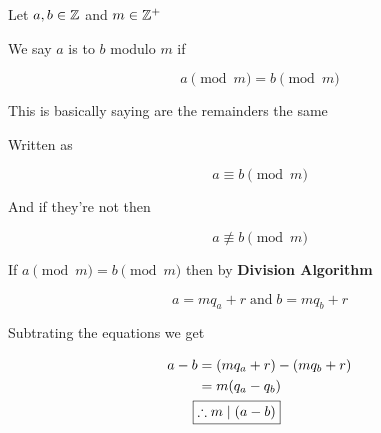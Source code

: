 \documentclass[../../Main.tex]{subfiles}
\begin{document}
\begin{definition}[Congruence]
    Let $a, b \in \mathbb{Z}$ and $m \in \mathbb{Z}^+$

    We say $a$ is  to $b$ modulo $m$ if

    $$a \pmod{m} = b \pmod{m}$$

    This is basically saying are the remainders the same

    Written as

    $$a \equiv b \pmod{m}$$

    And if they're not then

    $$a \not \equiv b \pmod{m}$$

    \begin{note}
        If $a \pmod{m} = b \pmod{m}$ then by \textbf{Division Algorithm}

        $$ a = mq_a + r \; \text{and} \; b = mq_b + r$$

        Subtrating the equations we get

        \begin{align*}
            a - b &= (mq_a + r) - (mq_b + r) \\
            &= m(q_a - q_b) \\
            \Aboxed{& \therefore m \mid (a - b)} \\
        \end{align*}
    \end{note}
\end{definition}
\end{document}
